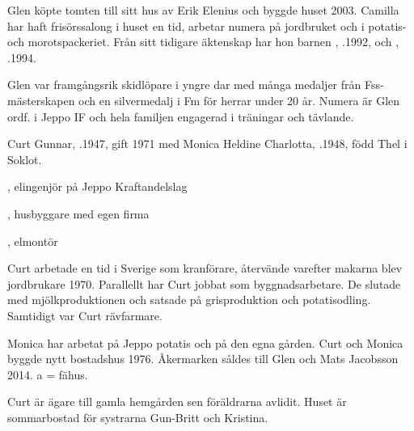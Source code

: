 Glen köpte tomten till sitt hus av Erik Elenius och byggde huset 2003. Camilla har haft frisörssalong i huset en tid, arbetar numera på jordbruket och i potatis- och morotspackeriet. Från sitt tidigare äktenskap har hon barnen , .1992, och , .1994.

Glen var framgångsrik skidlöpare i yngre dar med många medaljer från Fss-mästerskapen och en silvermedalj i Fm för herrar under 20 år. Numera är Glen ordf. i Jeppo IF och hela familjen engagerad i träningar och tävlande.



%



%
Curt Gunnar, .1947, gift 1971 med Monica Heldine Charlotta, .1948, född Thel i Soklot.
\begin{jhchildren}
  \item {}, elingenjör på Jeppo Kraftandelslag
  \item {}, husbyggare med egen firma
  \item {}, elmontör
\end{jhchildren}

Curt arbetade en tid i Sverige som kranförare, återvände varefter makarna blev jordbrukare 1970. Parallellt har Curt jobbat som byggnadsarbetare. De slutade med mjölkproduktionen och satsade på grisproduktion och potatisodling. Samtidigt var Curt rävfarmare.

Monica har arbetat på Jeppo potatis och på den egna gården. Curt och Monica byggde nytt bostadshus 1976. Åkermarken såldes till Glen och Mats Jacobsson 2014. a = fähus.



%



%
Curt är ägare till gamla hemgården sen föräldrarna avlidit. Huset är sommarbostad för systrarna Gun-Britt och Kristina.\jhvspace{}


